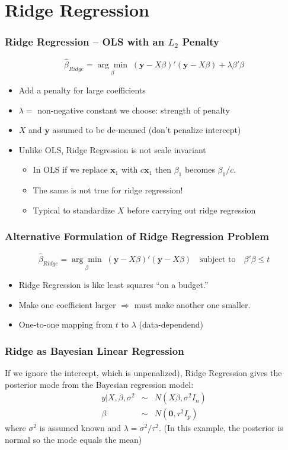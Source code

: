 \section{Ridge Regression}
\begin{frame}
  \frametitle{Ridge Regression -- OLS with an $L_2$ Penalty}


	$$\widehat{\beta}_{Ridge} =\underset{\beta}{\arg \min}\;(\mathbf{y} - X\beta)' (\mathbf{y} - X\beta) + \lambda \beta'\beta$$
  \begin{itemize}
    \item Add a penalty for large coefficients
    \item $\lambda = $ non-negative constant we choose: strength of penalty
    \item $X$ and $\mathbf{y}$ assumed to be \alert{de-meaned} (don't penalize intercept)
    \item Unlike OLS, Ridge Regression is \alert{not scale invariant}
      \begin{itemize}
        \item In OLS if we replace $\mathbf{x}_1$ with $c\mathbf{x}_1$ then $\beta_1$ becomes $\beta_1/c$.
        \item The same is not true for ridge regression!
        \item Typical to \alert{standardize} $X$ before carrying out ridge regression 
      \end{itemize}
  \end{itemize}
\end{frame}
\begin{frame}
  \frametitle{Alternative Formulation of Ridge Regression Problem}
$$\widehat{\beta}_{Ridge} = \underset{\beta}{\arg \min}\;(\mathbf{y} - X\beta)' (\mathbf{y} - X\beta) \quad \mbox{subject to} \quad \beta'\beta \leq t$$


\begin{itemize}
  \item Ridge Regression is like least squares ``on a budget.'' 
  \item Make one coefficient larger $\Rightarrow$ must make another one smaller.
  \item One-to-one mapping from $t$ to $\lambda$ (data-dependend)
\end{itemize}

\end{frame}
\begin{frame}
  \frametitle{Ridge as Bayesian Linear Regression}

If we ignore the intercept, which is unpenalized), Ridge Regression gives the \alert{posterior mode} from the Bayesian regression model:
	\begin{eqnarray*}
		y|X, \beta, \sigma^2 &\sim& N(X\beta,\sigma^2 I_n) \\
		\beta &\sim& N(\mathbf{0}, \tau^2 I_p)
	\end{eqnarray*}
where $\sigma^2$ is assumed known and $\lambda = \sigma^2/\tau^2$. 
(In this example, the posterior is normal so the mode equals the mean)


\end{frame}
